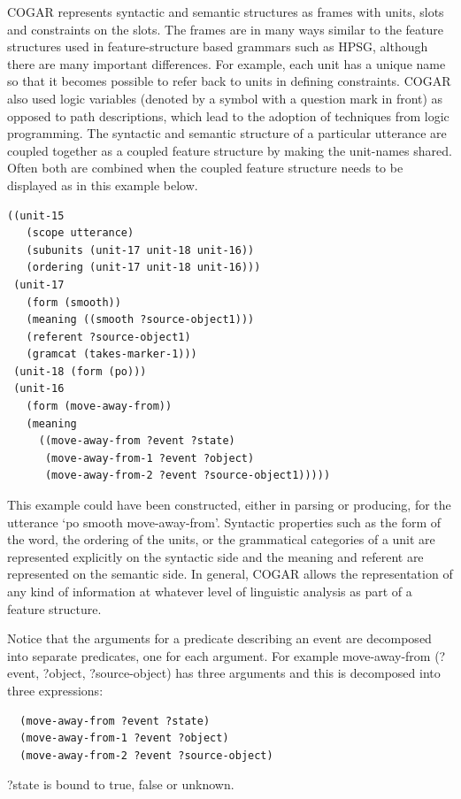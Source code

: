 COGAR represents syntactic and semantic structures as frames with units, slots and 
constraints on the slots. The frames are in many ways similar to the feature structures used in feature-structure 
based grammars such as HPSG, although there are many important differences. For example, each unit has a 
unique name so that it becomes possible to refer back to units in defining constraints. COGAR also used 
logic variables (denoted by a symbol with a question mark in front) as opposed to path descriptions, which 
lead to the adoption of techniques from logic programming. 
The syntactic and semantic structure of a particular utterance are coupled together as a coupled feature structure 
by making the unit-names shared. Often both are combined when the coupled feature structure needs to be displayed
as in this example below. 
\begin{verbatim}
((unit-15
   (scope utterance)
   (subunits (unit-17 unit-18 unit-16))
   (ordering (unit-17 unit-18 unit-16)))
 (unit-17
   (form (smooth))
   (meaning ((smooth ?source-object1)))
   (referent ?source-object1) 
   (gramcat (takes-marker-1)))
 (unit-18 (form (po)))
 (unit-16 
   (form (move-away-from)) 
   (meaning
     ((move-away-from ?event ?state) 
      (move-away-from-1 ?event ?object)
      (move-away-from-2 ?event ?source-object1)))))
\end{verbatim}
This example could have been constructed, either in parsing or producing, for 
the utterance `po smooth move-away-from'. Syntactic properties such as the form of the word, 
the ordering of the units, or the grammatical categories of a unit are represented explicitly on the syntactic side and 
the meaning and referent are represented on the semantic side. In general, COGAR allows the representation of
any kind of information at whatever level of linguistic analysis as part of a feature structure. 

Notice that the arguments for a predicate describing an event are decomposed into separate predicates, one for 
each argument. For example move-away-from (?event, ?object, ?source-object) has three arguments and this 
is decomposed into three expressions: 
\begin{verbatim}
  (move-away-from ?event ?state) 
  (move-away-from-1 ?event ?object)
  (move-away-from-2 ?event ?source-object)
\end{verbatim}
?state is bound to true, false or unknown. 


